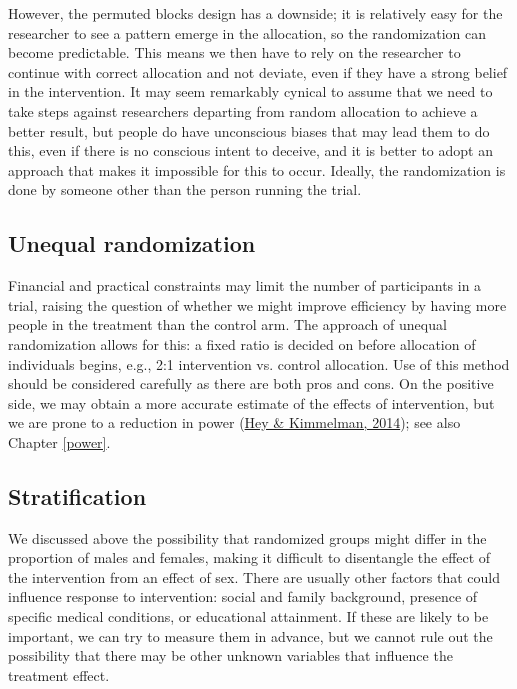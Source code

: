 \documentclass{krantz}
\begin{document}
However, the permuted blocks design has a downside; it is relatively easy for the researcher to see a pattern emerge in the allocation, so the randomization can become predictable. This means we then have to rely on the researcher to continue with correct allocation and not deviate, even if they have a strong belief in the intervention. It may seem remarkably cynical to assume that we need to take steps against researchers departing from random allocation to achieve a better result, but people do have unconscious biases that may lead them to do this, even if there is no conscious intent to deceive, and it is better to adopt an approach that makes it impossible for this to occur. Ideally, the randomization is done by someone other than the person running the trial.

\hypertarget{unequal-randomization}{%
\subsection{Unequal randomization}\label{unequal-randomization}}

Financial and practical constraints may limit the number of participants in a trial, raising the question of whether we might improve efficiency by having more people in the treatment than the control arm. The approach of unequal randomization allows for this: a fixed ratio is decided on before allocation of individuals begins, e.g., 2:1 intervention vs. control allocation. Use of this method should be considered carefully as there are both pros and cons. On the positive side, we may obtain a more accurate estimate of the effects of intervention, but we are prone to a reduction in power (\protect\hyperlink{ref-hey2014}{Hey \& Kimmelman, 2014}); see also Chapter \ref{power}.

\hypertarget{stratification}{%
\subsection{Stratification}\label{stratification}}

We discussed above the possibility that randomized groups might differ in the proportion of males and females, making it difficult to disentangle the effect of the intervention from an effect of sex. There are usually other factors that could influence response to intervention: social and family background, presence of specific medical conditions, or educational attainment. If these are likely to be important, we can try to measure them in advance, but we cannot rule out the possibility that there may be other unknown variables that influence the treatment effect.
\end{document}
